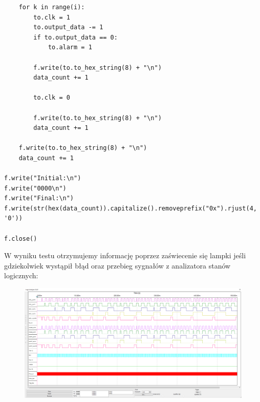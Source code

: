 \documentclass[a4paper]{article}
\begin{document}
\begin{verbatim}
    for k in range(i):
        to.clk = 1
        to.output_data -= 1
        if to.output_data == 0:
            to.alarm = 1

        f.write(to.to_hex_string(8) + "\n")
        data_count += 1

        to.clk = 0

        f.write(to.to_hex_string(8) + "\n")
        data_count += 1

    f.write(to.to_hex_string(8) + "\n")
    data_count += 1

f.write("Initial:\n")
f.write("0000\n")
f.write("Final:\n")
f.write(str(hex(data_count)).capitalize().removeprefix("0x").rjust(4, '0'))

f.close()
\end{verbatim}
\Large
W wyniku testu otrzymujemy informację poprzez zaświecenie się lampki jeśli gdziekolwiek wystąpił błąd oraz 
przebieg sygnałów z analizatora stanów logicznych:
\begin{figure}[H]
    \centering
    \includegraphics[width=\textwidth]{general_test_logic_analyzer.png}
\end{figure}
\pagebreak
\end{document}

